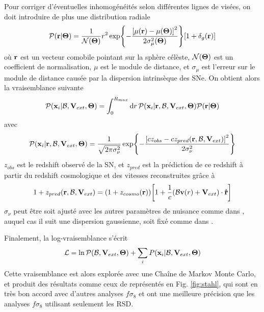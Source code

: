\documentclass{book}
\let\mcl\mathcal
\begin{document}
Pour corriger d'éventuelles inhomogénéités selon différentes lignes de visées, on doit introduire de plus une distribution radiale
\begin{equation}
    \mcl P(\vb r|\vb \Theta) = \frac{1}{\mcl N(\vb \Theta)} r^2 \exp{- \frac{\qty[\mu(\vb r) - \mu(\vb\Theta)]^2}{2 \sigma_\mu^2(\vb \Theta)}} \qty[1 + \delta_g(\vb r)]
\end{equation}
où $\vb r$ est un vecteur comobile pointant sur la sphère célèste, $\mcl N(\vb \Theta)$ est un coefficient de normalisation, $\mu$ est le module de distance, et $\sigma_\mu$ est l'erreur sur le module de distance causée par la dispersion intrinsèque des SNe. On obtient alors la vraisemblance suivante
\begin{equation}
    \mcl P(\vb x_i|\mcl B, \vb V_{ext}, \vb \Theta) = \int_0^{R_{max}} \dd{r} \mcl P (\vb x_i|\vb r, \mcl B, \vb V_{ext}, \vb \Theta) \mcl P(\vb r|\vb \Theta)
\end{equation}
avec
\begin{equation}
     \mcl P (\vb x_i|\vb r, \mcl B, \vb V_{ext}, \vb \Theta) = \frac{1}{\sqrt{2 \pi \sigma_\nu^2}} \exp{-\frac{\qty[c z_{obs} - cz_{pred}(\vb r, \mcl B, \vb V_{ext})]^2}{2\sigma_\nu^2}}
\end{equation}
$z_{obs}$ est le redshift observé de la SN, et $z_{pred}$ est la prédiction de ce redshift à partir du redshift cosmologique et des vitesses reconstruites grâce à
\begin{equation}
    1 + z_{pred}(\vb r, \mcl B, \vb V_{ext}) = (1 + z_{cosmo}(\vb r)) \qty[1 + \frac{1}{c} (\mcl B \vb v(r) + \vb V_{ext}) \cdot \vu r]
\end{equation}
$\sigma_\nu$ peut être soit ajusté avec les autres paramètres de nuisance comme dans \cite{stahl_peculiar-velocity_2021}, auquel cas il suit une dispersion gaussienne, soit fixé comme dans \cite{boruah_cosmic_2020}.

Finalement, la log-vraisemblance s'écrit
\begin{equation}
    \mcl L = \ln \mcl P(\mcl B, \vb V_{ext}, \vb \Theta) + \sum_i P(\vb x_i|\mcl B, \vb V_{ext}, \vb \Theta)
\end{equation}
Cette vraisemblance est alors explorée avec une Chaîne de Markov Monte Carlo, et produit des résultats comme ceux de \cite{stahl_peculiar-velocity_2021} représentés en Fig. \ref{fig:stahl}, qui sont en très bon accord avec d'autres analyses $f\sigma_8$ et ont une meilleure précision que les analyses $f\sigma_8$ utilisant seulement les RSD.
\end{document}

